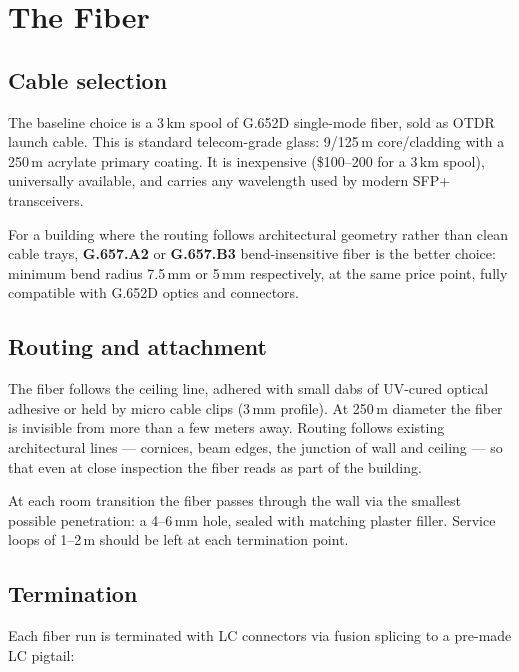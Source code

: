 \documentclass[]{anvil-proposal}
\begin{document}
\section{The Fiber}

\subsection{Cable selection}

The baseline choice is a 3\,km spool of G.652D single-mode fiber, sold as OTDR launch cable. This is standard telecom-grade glass: 9/125\,\textmu m core/cladding with a 250\,\textmu m acrylate primary coating. It is inexpensive (\$100--200 for a 3\,km spool), universally available, and carries any wavelength used by modern SFP+ transceivers.

For a building where the routing follows architectural geometry rather than clean cable trays, \textbf{G.657.A2} or \textbf{G.657.B3} bend-insensitive fiber is the better choice: minimum bend radius 7.5\,mm or 5\,mm respectively, at the same price point, fully compatible with G.652D optics and connectors.

\subsection{Routing and attachment}

The fiber follows the ceiling line, adhered with small dabs of UV-cured optical adhesive or held by micro cable clips (3\,mm profile). At 250\,\textmu m diameter the fiber is invisible from more than a few meters away. Routing follows existing architectural lines --- cornices, beam edges, the junction of wall and ceiling --- so that even at close inspection the fiber reads as part of the building.

At each room transition the fiber passes through the wall via the smallest possible penetration: a 4--6\,mm hole, sealed with matching plaster filler. Service loops of 1--2\,m should be left at each termination point.

\subsection{Termination}

Each fiber run is terminated with LC connectors via fusion splicing to a pre-made LC pigtail:
\end{document}
